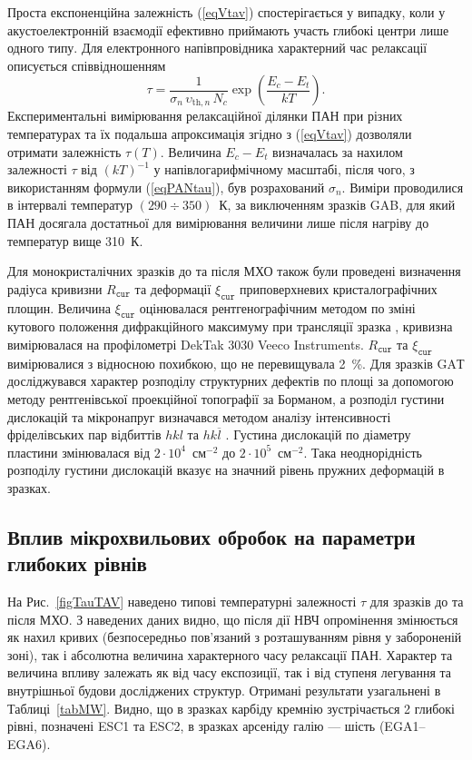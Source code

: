 \documentclass[a4paper,14pt,oneside,openany]{memoir}
\begin{document}
Проста експоненційна залежність (\ref{eqVtav}) спостерігається у випадку, коли у акустоелектронній взаємодії ефективно приймають участь глибокі центри лише одного типу.
Для електронного напівпровідника характерний час релаксації описується співвідношенням \cite{Saiko1993,Rzanov,OstrovPAN}
\begin{equation}\label{eqPANtau}
  \tau=\frac{1}{\sigma_n\,\upsilon_{\mathrm{th},n}\,N_c}\exp\left(\frac{E_c-E_t}{kT}\right).
\end{equation}
Експериментальні вимірювання релаксаційної ділянки ПАН при різних температурах та їх подальша апроксимація згідно з (\ref{eqVtav}) дозволяли отримати
залежність $\tau(T)$.
Величина $E_c-E_t$ визначалась за нахилом залежності $\tau$ від $(kT)^{-1}$ у напівлогарифмічному масштабі, після чого, з використанням формули (\ref{eqPANtau}),
був розрахований $\sigma_n$.
Виміри проводилися в інтервалі температур $(290\div350)$~К,
за виключенням зразків GAB, для який ПАН досягала достатньої для вимірювання величини лише після нагріву до температур вище 310~К.

Для монокристалічних зразків до та після МХО також були проведені визначення радіуса кривизни $R_\mathtt{cur}$ та
деформації $\xi_\mathtt{cur}$ приповерхневих кристалографічних площин.
Величина $\xi_\mathtt{cur}$ оцінювалася рентгенографічним методом по зміні кутового положення дифракційного максимуму при трансляції зразка \cite{Godwod},
кривизна вимірювалася на профілометрі DekTak 3030 Veeco Instruments.
$R_\mathtt{cur}$ та $\xi_\mathtt{cur}$ вимірювалися  з відносною похибкою, що не перевищувала 2~\%.
Для зразків GAТ досліджувався характер розподілу структурних дефектів по площі за допомогою методу
рентгенівської проекційної топографії за Борманом,
а розподіл густини дислокацій та мікронапруг визначався методом аналізу інтенсивності фріделівських пар відбиттів $hkl$ та $hk\overline{l}$ \cite{ThoricBook}.
Густина дислокацій по діаметру пластини змінювалася від $2\cdot10^{4}$~см$^{-2}$ до $2\cdot10^{5}$~см$^{-2}$.
Така неоднорідність розподілу густини дислокацій вказує на значний рівень пружних деформацій в зразках.

\subsection{Вплив мікрохвильових обробок на параметри глибоких рівнів}

На Рис.~\ref{figTauTAV} наведено типові температурні залежності $\tau$ для зразків до та після МХО.
З наведених даних видно, що після дії НВЧ опромінення змінюється як нахил кривих (безпосередньо пов'язаний
з розташуванням рівня у забороненій зоні), так і абсолютна величина характерного часу релаксації ПАН.
Характер та величина впливу залежать як від часу експозиції, так і від ступеня легування та внутрішньої будови
досліджених структур.
Отримані результати узагальнені в Таблиці~\ref{tabMW}.
Видно, що в зразках карбіду кремнію зустрічається 2 глибокі рівні, позначені ESC1 та ESC2,
в зразках арсеніду галію --- шість (EGA1--EGA6).
\end{document}
